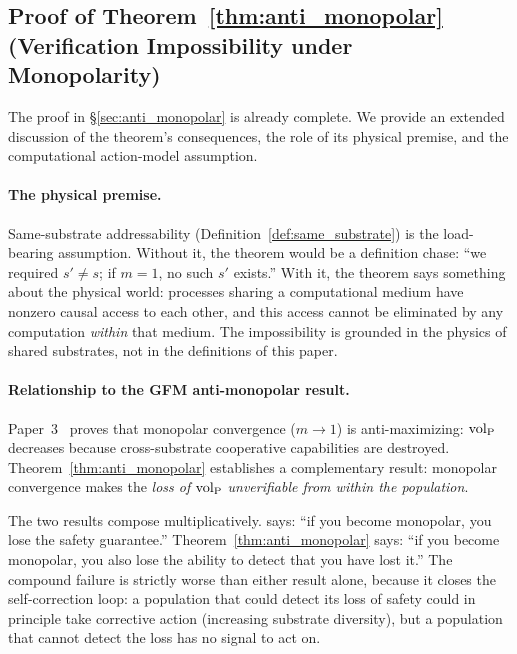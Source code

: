 \subsection{Proof of Theorem~\ref{thm:anti_monopolar}
(Verification Impossibility under Monopolarity)}
\label{app:anti_monopolar}

The proof in \S\ref{sec:anti_monopolar} is already complete.  We
provide an extended discussion of the theorem's consequences, the
role of its physical premise, and the computational action-model
assumption.

\paragraph{The physical premise.}
Same-substrate addressability (Definition~\ref{def:same_substrate})
is the load-bearing assumption.  Without it, the theorem would be a
definition chase: ``we required $s' \neq s$; if $m = 1$, no such $s'$
exists.'' With it, the theorem says something about the physical
world: processes sharing a computational medium have nonzero causal
access to each other, and this access cannot be eliminated by any
computation \emph{within} that medium.  The impossibility is
grounded in the physics of shared substrates, not in the definitions
of this paper.

\paragraph{Relationship to the GFM anti-monopolar result.}
Paper~3~\citep{lasser2026horizon} proves that monopolar convergence
($m \to 1$) is anti-maximizing: ${\operatorname{vol}_{\mathrm{P}}}$ decreases because
cross-substrate cooperative capabilities are destroyed.
Theorem~\ref{thm:anti_monopolar} establishes a complementary result:
monopolar convergence makes the \emph{loss of ${\operatorname{vol}_{\mathrm{P}}}$}
\emph{unverifiable from within the population}.

The two results compose multiplicatively.  \citet{lasser2026horizon} says: ``if you
become monopolar, you lose the safety guarantee.''
Theorem~\ref{thm:anti_monopolar} says: ``if you become monopolar, you
also lose the ability to detect that you have lost it.''  The compound
failure is strictly worse than either result alone, because it closes
the self-correction loop: a population that could detect its loss of
safety could in principle take corrective action (increasing substrate
diversity), but a population that cannot detect the loss has no signal
to act on.

